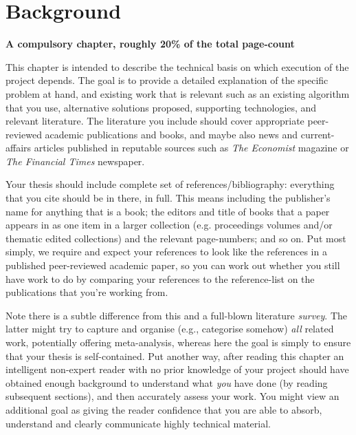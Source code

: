 \documentclass[ %
                    author={Daniel Page},
                supervisor={Dr. Andrew Calway},
                    degree={MSc},
                     title={Some Structural Guidelines for Data Science MSc Theses, Including Those With Long Titles that Run Across Multiple Lines on the Front Page},
                  subtitle={And those including an optional subtitle too, for good measure},
                      type={},
                      year={2021}]{dissertation}
\begin{document}
\chapter{Background}
\label{chap:background}

{\bf A compulsory chapter, roughly 20\% of the total page-count}
\vspace{1cm} 

\noindent
This chapter is intended to describe the technical basis on which execution
of the project depends.  The goal is to provide a detailed explanation of
the specific problem at hand, and existing work that is relevant such as an
existing algorithm that you use, alternative solutions proposed, supporting
technologies, and relevant literature. The literature you include should cover 
appropriate peer-reviewed academic publications and books, and maybe also 
news and current-affairs articles published in reputable sources such as 
{\em The Economist} magazine or {\em The Financial Times} newspaper. 

Your thesis should include complete set of references/bibliography: everything that you cite should be in there, in full. This means including the publisher's name for anything that is a book; the editors and title of books that a paper appears in as one item in a larger collection (e.g. proceedings volumes and/or thematic edited collections) and the relevant page-numbers; and so on. Put most simply, we require and expect your references to look like the references in a published peer-reviewed academic paper, so you can work out whether you still have work to do by comparing your references to the reference-list on the publications that you're working from. 

Note there is a subtle difference from
this and a full-blown literature {\em survey}.  The latter might try
to capture and organise (e.g., categorise somehow) {\em all}\/ related work,
potentially offering meta-analysis, whereas here the goal is simply to
ensure that your thesis is self-contained.  Put another way, after reading 
this chapter an intelligent non-expert reader with no prior knowledge of your project should have obtained enough background to 
understand what {\em you}\/ have done (by reading subsequent sections), and then 
accurately assess your work.  You might view an additional goal as giving 
the reader confidence that you are able to absorb, understand and clearly 
communicate highly technical material.
\end{document}
